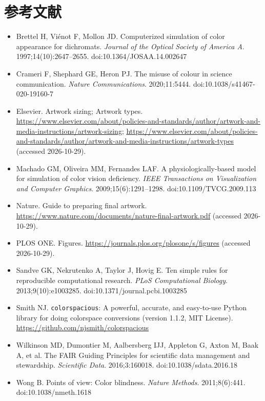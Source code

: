 \section*{参考文献}

\begin{itemize}
\item Brettel H, Vi\'{e}not F, Mollon JD. Computerized simulation of color appearance for dichromats. \textit{Journal of the Optical Society of America A}. 1997;14(10):2647--2655. doi:10.1364/JOSAA.14.002647
\item Crameri F, Shephard GE, Heron PJ. The misuse of colour in science communication. \textit{Nature Communications}. 2020;11:5444. doi:10.1038/s41467-020-19160-7
\item Elsevier. Artwork sizing; Artwork types. \url{https://www.elsevier.com/about/policies-and-standards/author/artwork-and-media-instructions/artwork-sizing}; \url{https://www.elsevier.com/about/policies-and-standards/author/artwork-and-media-instructions/artwork-types} (accessed 2026-10-29).
\item Machado GM, Oliveira MM, Fernandes LAF. A physiologically-based model for simulation of color vision deficiency. \textit{IEEE Transactions on Visualization and Computer Graphics}. 2009;15(6):1291--1298. doi:10.1109/TVCG.2009.113
\item Nature. Guide to preparing final artwork. \url{https://www.nature.com/documents/nature-final-artwork.pdf} (accessed 2026-10-29).
\item PLOS ONE. Figures. \url{https://journals.plos.org/plosone/s/figures} (accessed 2026-10-29).
\item Sandve GK, Nekrutenko A, Taylor J, Hovig E. Ten simple rules for reproducible computational research. \textit{PLoS Computational Biology}. 2013;9(10):e1003285. doi:10.1371/journal.pcbi.1003285
\item Smith NJ. \texttt{colorspacious}: A powerful, accurate, and easy-to-use Python library for doing colorspace conversions (version 1.1.2, MIT License). \url{https://github.com/njsmith/colorspacious}
\item Wilkinson MD, Dumontier M, Aalbersberg IJJ, Appleton G, Axton M, Baak A, et al. The FAIR Guiding Principles for scientific data management and stewardship. \textit{Scientific Data}. 2016;3:160018. doi:10.1038/sdata.2016.18
\item Wong B. Points of view: Color blindness. \textit{Nature Methods}. 2011;8(6):441. doi:10.1038/nmeth.1618
\end{itemize}

